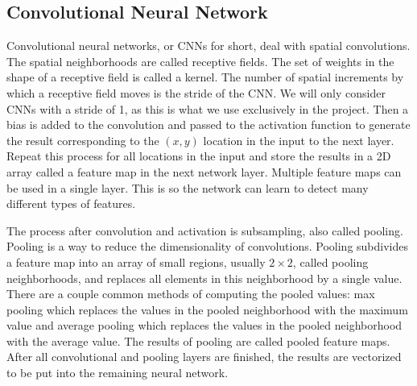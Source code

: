 \documentclass{IEEEtran}
\begin{document}
\subsection{Convolutional Neural Network}
Convolutional neural networks, or CNNs for short, deal with spatial
convolutions. The spatial neighborhoods are called receptive fields. The set of
weights in the shape of a receptive field is called a kernel. The number of 
spatial increments by which a receptive field moves is the stride of the CNN. We
will only consider CNNs with a stride of 1, as this is what we use exclusively
in the project. Then a bias is added to the convolution and passed to the
activation function to generate the result corresponding to the \((x, y)\)
location in the input to the next layer. Repeat this process for all locations
in the input and store the results in a 2D array called a feature map in the
next network layer. Multiple feature maps can be used in a single layer. This is
so the network can learn to detect many different types of features.

The process after convolution and activation is subsampling, also called
pooling. Pooling is a way to reduce the dimensionality of convolutions. Pooling
subdivides a feature map into an array of small regions, usually \(2\times 2\),
called pooling neighborhoods, and replaces all elements in this neighborhood by
a single value. There are a couple common methods of computing the pooled
values: max pooling which replaces the values in the pooled neighborhood with
the maximum value and average pooling which replaces the values in the pooled
neighborhood with the average value. The results of pooling are called pooled
feature maps. After all convolutional and pooling layers are finished, the
results are vectorized to be put into the remaining neural network.
\end{document}
